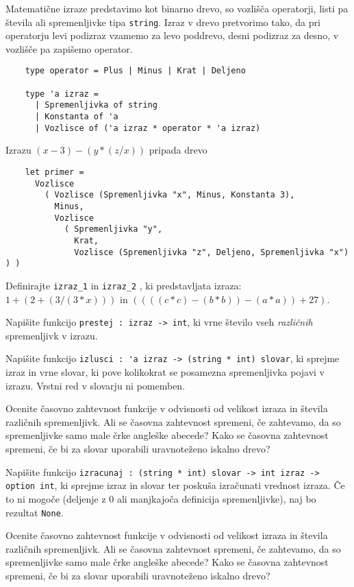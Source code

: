 \documentclass[arhiv]{../izpit}
\begin{document}
Matematične izraze predstavimo kot binarno drevo, so vozlišča operatorji, listi pa števila ali spremenljivke tipa \verb|string|.
Izraz v drevo pretvorimo tako, da pri operatorju levi podizraz vzamemo za levo poddrevo, desni podizraz za desno, v vozlišče pa zapišemo operator.
\begin{verbatim}
    type operator = Plus | Minus | Krat | Deljeno

    type 'a izraz =
      | Spremenljivka of string
      | Konstanta of 'a
      | Vozlisce of ('a izraz * operator * 'a izraz)
\end{verbatim}	
Izrazu $(x - 3) - (y * (z  / x))$ pripada drevo
\begin{verbatim}
    let primer =
      Vozlisce
        ( Vozlisce (Spremenljivka "x", Minus, Konstanta 3),
          Minus,
          Vozlisce
            ( Spremenljivka "y",
              Krat,
              Vozlisce (Spremenljivka "z", Deljeno, Spremenljivka "x") ) )
\end{verbatim}

\podnaloga Definirajte \verb|izraz_1| in \verb|izraz_2| , ki predstavljata izraza:  $1 + (2 + (3 / ( 3 * x)))$ in $((((c * c) - (b * b)) - (a * a)) + 27)$.

\podnaloga Napišite funkcijo \verb|prestej : izraz -> int|, ki vrne število vseh \emph{različnih} spremenljivk v izrazu.

\podnaloga Napišite funkcijo \verb|izlusci : 'a izraz -> (string * int) slovar|, ki sprejme izraz in vrne slovar, ki pove kolikokrat se posamezna spremenljivka pojavi v izrazu. Vrstni red v slovarju ni pomemben.

  Ocenite časovno zahtevnost funkcije v odvisnosti od velikost izraza in števila različnih spremenljivk. Ali se časovna zahtevnost spremeni, če zahtevamo, da so spremenljivke samo male črke angleške abecede?
  Kako se časovna zahtevnost spremeni, če bi za slovar uporabili uravnoteženo iskalno drevo?

\podnaloga Napišite funkcijo \verb|izracunaj : (string * int) slovar -> int izraz -> option int|, ki sprejme izraz in slovar ter poskuša izračunati vrednost izraza. Če to ni mogoče (deljenje z 0 ali manjkajoča definicija spremenljivke), naj bo rezultat \verb|None|. 

  Ocenite časovno zahtevnost funkcije v odvisnosti od velikost izraza in števila različnih spremenljivk. Ali se časovna zahtevnost spremeni, če zahtevamo, da so spremenljivke samo male črke angleške abecede?
  Kako se časovna zahtevnost spremeni, če bi za slovar uporabili uravnoteženo iskalno drevo?
\end{document}
